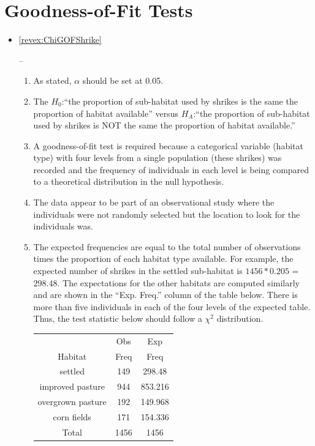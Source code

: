 \documentclass[10pt,openany]{book}\usepackage[]{graphicx}\usepackage[]{color}
\begin{document}
\section*{Goodness-of-Fit Tests}
\begin{itemize}
  \item \hypertarget{ans:ChiGOFShrike}{\ref{revex:ChiGOFShrike}} --
    \begin{enumerate}
      \item As stated, $\alpha$ should be set at 0.05.
      \item The $H_{0}$:``the proportion of sub-habitat used by shrikes is the same the proportion of habitat available'' versus $H_{A}$:``the proportion of sub-habitat used by shrikes is NOT the same the proportion of habitat available.''
      \item A goodness-of-fit test is required because a categorical variable (habitat type) with four levels from a single population (these shrikes) was recorded and the frequency of individuals in each level is being compared to a theoretical distribution in the null hypothesis.
      \item The data appear to be part of an observational study where the individuals were not randomly selected but the location to look for the individuals was.
      \item The expected frequencies are equal to the total number of observations times the proportion of each habitat type available.  For example, the expected number of shrikes in the settled sub-habitat is $1456*0.205$ = $298.48$.  The expectations for the other habitats are computed similarly and are shown in the ``Exp. Freq.'' column of the table below.  There is more than five individuals in each of the four levels of the expected table.  Thus, the test statistic below should follow a $\chi^{2}$ distribution.
        \begin{center}
          \begin{tabular}{ccc}
            \hline\hline
            & Obs & Exp \\
            Habitat & Freq & Freq \\
            \hline
            settled           & 149 & 298.48 \\
            improved pasture  & 944 & 853.216 \\
            overgrown pasture & 192 & 149.968 \\
            corn fields       & 171 & 154.336 \\
            \hline
            Total & 1456 & 1456 \\

\end{tabular}
\end{center}
\end{enumerate}
\end{itemize}
\end{document}
